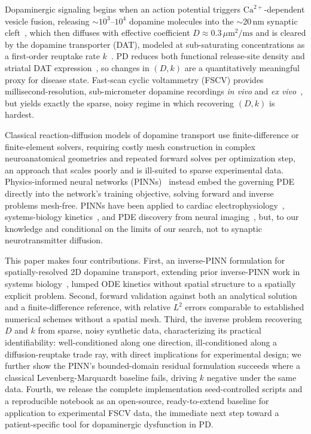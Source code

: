 \documentclass[pdflatex,sn-basic,Numbered]{sn-jnl}
\theoremstyle{thmstyleone}
\theoremstyle{thmstyletwo}
\begin{document}
Dopaminergic signaling begins when an action potential triggers
$\text{Ca}^{2+}$-dependent vesicle fusion, releasing
$\sim$$10^3$--$10^4$ dopamine molecules into the $\sim$20\,nm
synaptic cleft~\cite{Wiencke2020}, which then diffuses with
effective coefficient $D \approx 0.3\,\mu\text{m}^2/\text{ms}$
\cite{Nicholson1981, CraggRice2004} and is cleared by the
dopamine transporter (DAT), modeled at sub-saturating
concentrations as a first-order reuptake rate
$k$~\cite{CraggRice2004}. PD reduces both functional release-site
density and striatal DAT expression~\cite{Rice2008,
CraggRice2004}, so changes in $(D, k)$ are a quantitatively
meaningful proxy for disease state. Fast-scan cyclic voltammetry
(FSCV) provides millisecond-resolution, sub-micrometer dopamine
recordings \emph{in vivo} and \emph{ex vivo}~\cite{Rodeberg2017},
but yields exactly the sparse, noisy regime in which recovering
$(D, k)$ is hardest.

Classical reaction-diffusion models of dopamine transport
\cite{Nicholson1981, Rice2008, Wiencke2020} use finite-difference
or finite-element solvers, requiring costly mesh construction in
complex neuroanatomical geometries and repeated forward solves
per optimization step, an approach that scales poorly and is
ill-suited to sparse experimental data. Physics-informed neural
networks (PINNs)~\cite{Raissi2019} instead embed the governing
PDE directly into the network's training objective, solving
forward and inverse problems mesh-free. PINNs have been applied
to cardiac electrophysiology~\cite{Sahli2020}, systems-biology
kinetics~\cite{Yazdani2020}, and PDE discovery from neural
imaging~\cite{Rudy2017}, but, to our knowledge and conditional
on the limits of our search, not to synaptic neurotransmitter
diffusion.

This paper makes four contributions. First, an inverse-PINN
formulation for spatially-resolved 2D dopamine transport,
extending prior inverse-PINN work in systems
biology~\cite{Yazdani2020}, lumped ODE kinetics without spatial
structure to a spatially explicit problem. Second, forward
validation against both an analytical solution and a
finite-difference reference, with relative $L^2$ errors
comparable to established numerical schemes without a spatial
mesh. Third, the inverse problem recovering $D$ and $k$ from
sparse, noisy synthetic data, characterizing its practical
identifiability: well-conditioned along one direction,
ill-conditioned along a diffusion-reuptake trade ray, with
direct implications for experimental design; we further show the
PINN's bounded-domain residual formulation succeeds where a
classical Levenberg-Marquardt baseline fails, driving $k$
negative under the same data. Fourth, we release the complete
implementation seed-controlled scripts and a reproducible
notebook as an open-source, ready-to-extend baseline for
application to experimental FSCV data, the immediate next step
toward a patient-specific tool for dopaminergic dysfunction in
PD.
\end{document}
